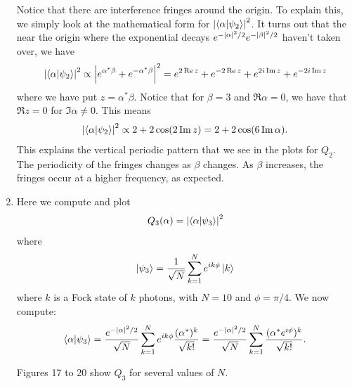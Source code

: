 \documentclass{article}
\theoremstyle{definition}
\newcommand{\al}{\alpha}
\newcommand{\be}{\beta}
\newcommand{\f}[2]{\frac{#1}{#2}}
\begin{document}
\begin{enumerate}[label=\alph*)]
	\noindent Notice that there are interference fringes around the origin. To explain this, we simply look at the mathematical form for $\abs{\braket{\al}{\psi_2}}^2$. It turns out that the near the origin where the exponential decays $e^{-\abs{\al}^2/2} e^{-\abs{\be}^2/2}$ haven't taken over, we have
	\begin{align*}
		\abs{\braket{\al}{\psi_2}}^2 \propto \abs{e^{\al^*\be} + e^{-\al^*\be}}^2 = e^{2\Re z}+ e^{-2\Re z} + e^{2i \Im z} + e^{-2i \Im z}
	\end{align*}
	where we have put $z = \al^*\be$. Notice that for $\be = 3$ and $\Re \al = 0$, we have that $\Re z =0$ for $\Im \al \neq 0$. This means 
	\begin{align*}
			\abs{\braket{\al}{\psi_2}}^2 \propto 2 + 2\cos(2\Im z) = 2 + 2\cos(6 \Im \al).
	\end{align*}
	This explains the vertical periodic pattern that we see in the plots for $Q_2$. The periodicity of the fringes changes as $\be$ changes. As $\be$ increases, the fringes occur at a higher frequency, as expected. 

	
	\item Here we compute and plot 
	\begin{align*}
		Q_3(\al) = \abs{\braket{\al}{\psi_3}}^2
	\end{align*}
	where
	\begin{align*}
		\ket{\psi_3} = \f{1}{\sqrt{N}} \sum^N_{k=1} e^{ik\phi} \ket{k}
	\end{align*}
	where $k$ is a Fock state of $k$ photons, with $N=10$ and $\phi = \pi/4$. We now compute:
	\begin{align*}
		\braket{\al}{\psi_3} = \f{e^{-\abs{\al}^2/2}}{\sqrt{N}}\sum_{k=1}^N e^{ik\phi} \f{(\al^*)^k}{\sqrt{k!}} = \f{e^{-\abs{\al}^2/2}}{\sqrt{N}} \sum_{k=1}^{N} \f{(\al^* e^{i\phi})^k}{\sqrt{k!}}.
	\end{align*}
	
	
	Figures 17 to 20 show $Q_3$ for several values of $N$. 
	

\end{enumerate}
\end{document}
